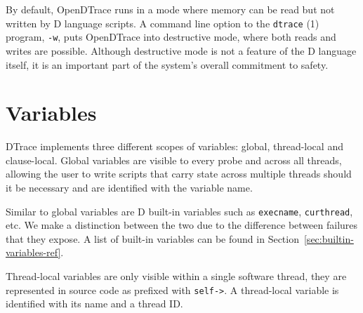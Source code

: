 By default, OpenDTrace runs in a mode where memory can be read but not
written by D language scripts.  A command line option to the \texttt{dtrace} (1)
program, \texttt{-w}, puts OpenDTrace into destructive mode, where both reads
and writes are possible.  Although destructive mode is not a feature of
the D language itself, it is an important part of the system's overall
commitment to safety.





\section{Variables}
\label{sec:d-variables}
DTrace implements three different scopes of variables: global, thread-local and
clause-local. Global variables are visible to every probe and across all
threads, allowing the user to write scripts that carry state across multiple
threads should it be necessary and are identified with the variable name.

Similar to global variables are D built-in variables such as \verb|execname|,
\verb|curthread|, etc. We make a distinction between the two due to the
difference between failures that they expose. A list of built-in variables can
be found in Section~\ref{sec:builtin-variables-ref}.

Thread-local variables are only visible within a single software thread, they
are represented in source code as prefixed with \texttt{self->}.  A thread-local
variable is identified with its name and a thread ID.

